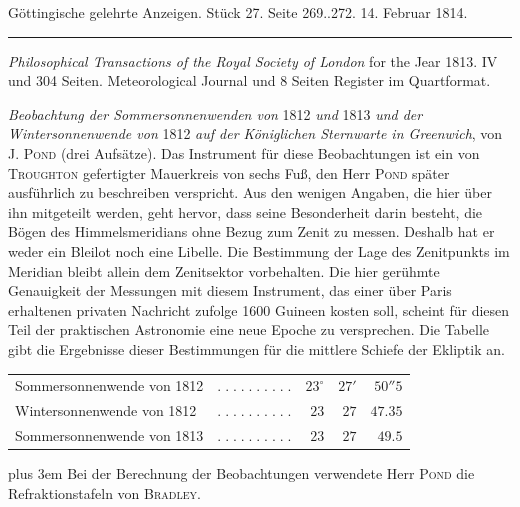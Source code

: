 \clearpage
{}

\hypertarget{native-566-lower}{}
\begin{center}\small Göttingische gelehrte Anzeigen. Stück 27. Seite 269..272. 14. Februar 1814.\\[3pt]\rule{.72\linewidth}{.3pt}\end{center}

\emph{Philosophical Transactions of the Royal Society of London} for the Jear 1813. IV und 304 Seiten. Meteorological Journal und 8 Seiten Register im Quartformat.

\emph{Beobachtung der Sommersonnenwenden von} 1812 \emph{und} 1813 \emph{und der Wintersonnenwende von} 1812 \emph{auf der Königlichen Sternwarte in Greenwich}, von J. \textsc{Pond} (drei Aufsätze). Das Instrument für diese Beobachtungen ist ein von \textsc{Troughton} gefertigter Mauerkreis von sechs Fuß, den Herr \textsc{Pond} später ausführlich zu beschreiben verspricht. Aus den wenigen Angaben, die hier über ihn mitgeteilt werden, geht hervor, dass seine Besonderheit darin besteht, die Bögen des Himmelsmeridians ohne Bezug zum Zenit zu messen. Deshalb hat er weder ein Bleilot noch eine Libelle. Die Bestimmung der Lage des Zenitpunkts im Meridian bleibt allein dem Zenitsektor vorbehalten. Die hier gerühmte Genauigkeit der Messungen mit diesem Instrument, das einer über Paris erhaltenen privaten Nachricht zufolge 1600 Guineen kosten soll, scheint für diesen Teil der praktischen Astronomie eine neue Epoche zu versprechen. Die Tabelle gibt die Ergebnisse dieser Bestimmungen für die mittlere Schiefe der Ekliptik an.

\begin{center}\fontsize{9}{11}\selectfont\setlength{\tabcolsep}{3pt}\renewcommand{\arraystretch}{1.18}\begin{tabular}{@{}l c r@{\;}r@{\;}r@{}}
Sommersonnenwende von 1812 & $.\;.\;.\;.\;.\;.\;.\;.\;.\;.$ & $23^\circ$ & $27'$ & $50''5$\\
Wintersonnenwende von 1812 & $.\;.\;.\;.\;.\;.\;.\;.\;.\;.$ & $23$ & $27$ & $47.35$\\
Sommersonnenwende von 1813 & $.\;.\;.\;.\;.\;.\;.\;.\;.\;.$ & $23$ & $27$ & $49.5$\\
\end{tabular}\end{center}

{\rightskip=0pt plus 3em Bei der Berechnung der Beobachtungen verwendete Herr \textsc{Pond} die Refraktionstafeln von \textsc{Bradley}.\par}

